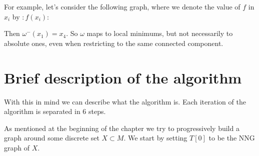 \label{ex1}
\begin{example}
For example, let's consider the following graph, where we denote the
value of $f$ in $x_i$ by $:f(x_i)$:


\begin{center}
%
%
%



\end{center}

Then $\omega^-(x_1)=x_4$. So $\omega$ maps 
to local minimums, but not necessarily to absolute ones,
even when restricting to the same connected component. 


\end{example}


\section{Brief description of the algorithm}

With this in mind we can describe what the algorithm is. Each
iteration of the algorithm 
is separated in 6 steps.

As mentioned at the beginning of the chapter we try to progressively build a 
graph around some discrete set $X\subset M$. We start by setting
$T[0]$ to be the NNG graph of $X$.

